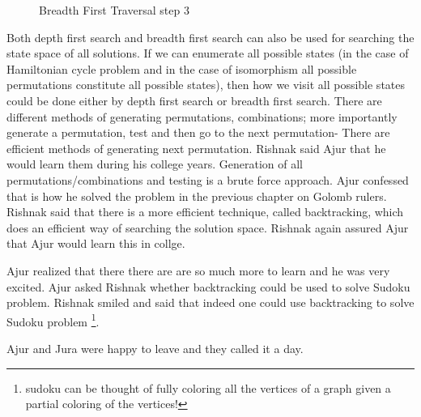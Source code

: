 \begin{figure}
\begin{center}
\caption{ Breadth First Traversal step 3}\label{20g10}
\end{center}
\end{figure}

Both depth first search and breadth first search can also be used for searching the state space of all solutions. If we can enumerate all possible states (in the case of Hamiltonian cycle problem and in the case of isomorphism all possible permutations constitute all possible states), then how we visit all possible states could be done either by depth first search or breadth first search.
There are different methods of generating permutations, combinations; more importantly generate a permutation, test and then go to the next permutation- There are efficient methods of generating next permutation. Rishnak said Ajur that he would learn them during his college years.
Generation of all permutations/combinations and testing is a brute force approach. Ajur confessed that is how he solved the problem in the previous chapter on Golomb rulers. Rishnak said that there is a more efficient technique, called backtracking, which does an efficient way of searching the solution space. Rishnak again assured Ajur that Ajur would learn this in collge.

Ajur realized that there there are are so much more to learn and he was very excited. Ajur asked Rishnak whether backtracking could be used to solve Sudoku problem. Rishnak smiled and said that indeed one could use backtracking to solve Sudoku problem \footnote{sudoku can be thought of fully coloring all the vertices of a graph given a partial coloring of the vertices!}.

Ajur and Jura were happy to leave and they called it a day.


